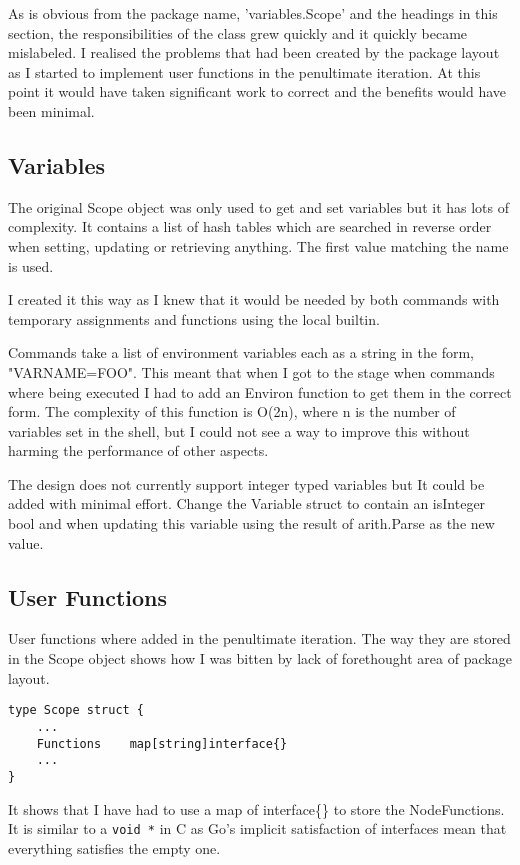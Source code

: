 As is obvious from the package name, 'variables.Scope' and the headings in this section, the responsibilities of the class grew quickly and it quickly became mislabeled.
I realised the problems that had been created by the package layout
as I started to implement user functions in the penultimate iteration.
At this point it would have taken significant work to correct and the benefits would have been minimal.

\subsection{Variables}
The original Scope object was only used to get and set variables but it has lots of complexity.
It contains a list of hash tables which are searched in reverse order when setting, updating or retrieving anything.
The first value matching the name is used.

I created it this way as I knew that it would be needed by both commands with temporary assignments and functions using the local builtin.

Commands take a list of environment variables each as a string in the form, "VARNAME=FOO".
This meant that when I got to the stage when commands where being executed I had to add an Environ function to get them in the correct form.
The complexity of this function is O(2n), where n is the number of variables set in the shell, but I could not see a way to improve this without harming the performance of other aspects.

The design does not currently support integer typed variables but It could be added with minimal effort.
Change the Variable struct to contain an isInteger bool and when updating this variable using the result of arith.Parse as the new value. 
\subsection{User Functions}
\label{sec:user-functions}
User functions where added in the penultimate iteration.
The way they are stored in the Scope object shows how I was bitten by lack of forethought area of package layout.

\begin{verbatim}
type Scope struct {
	...
	Functions    map[string]interface{}
	...
}
\end{verbatim}

It shows that I have had to use a map of interface\{\} to store the NodeFunctions.
It is similar to a \verb!void *! in C as Go's implicit satisfaction of interfaces mean that everything satisfies the empty one.

